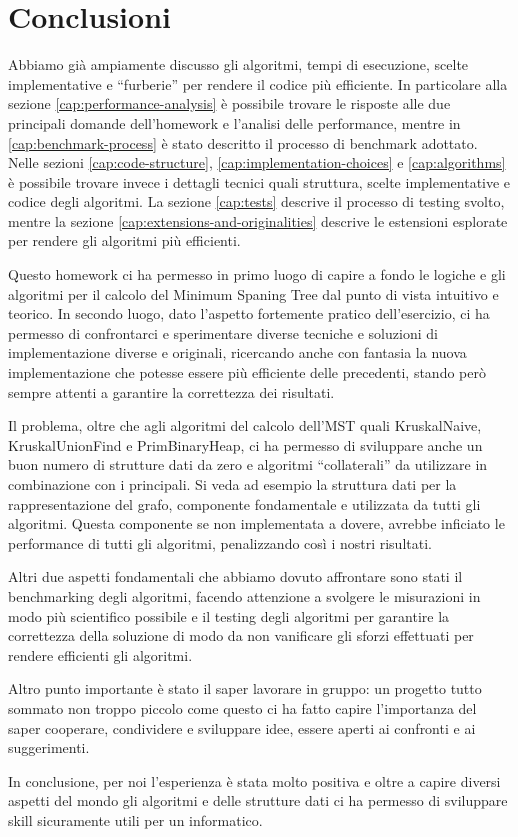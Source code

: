 \section{Conclusioni}
\label{cap:conclusions}

Abbiamo già ampiamente discusso gli algoritmi, tempi di esecuzione, scelte implementative e ``furberie'' per rendere il codice più
efficiente. In particolare alla sezione \ref{cap:performance-analysis} è possibile trovare le risposte alle due principali domande
dell'homework e l'analisi delle performance, mentre in \ref{cap:benchmark-process} è stato descritto il processo di benchmark adottato. 
Nelle sezioni \ref{cap:code-structure}, \ref{cap:implementation-choices} e \ref{cap:algorithms} è possibile trovare invece
i dettagli tecnici quali struttura, scelte implementative e codice degli algoritmi. La sezione \ref{cap:tests} descrive il processo
di testing svolto, mentre la sezione \ref{cap:extensions-and-originalities} descrive le estensioni esplorate per rendere gli 
algoritmi più efficienti.

Questo homework ci ha permesso in primo luogo di capire a fondo le logiche e gli algoritmi per il calcolo del Minimum Spaning Tree dal
punto di vista intuitivo e teorico. In secondo luogo, dato l'aspetto fortemente pratico dell'esercizio, ci ha permesso di confrontarci
e sperimentare diverse tecniche e soluzioni di implementazione diverse e originali, ricercando anche con fantasia la nuova 
implementazione che potesse essere più efficiente delle precedenti, stando però sempre attenti a garantire la correttezza dei risultati.

Il problema, oltre che agli algoritmi del calcolo dell'MST quali KruskalNaive, KruskalUnionFind e PrimBinaryHeap, ci ha permesso di 
sviluppare anche un buon numero di strutture dati da zero e algoritmi ``collaterali'' da utilizzare in combinazione con i principali.
Si veda ad esempio la struttura dati per la rappresentazione del grafo, componente fondamentale e utilizzata da tutti gli algoritmi. 
Questa componente se non implementata a dovere, avrebbe inficiato le performance di tutti gli algoritmi, penalizzando così i nostri
risultati.

Altri due aspetti fondamentali che abbiamo dovuto affrontare sono stati il benchmarking degli algoritmi, facendo attenzione a svolgere
le misurazioni in modo più scientifico possibile e il testing degli algoritmi per garantire la correttezza della soluzione di modo da
non vanificare gli sforzi effettuati per rendere efficienti gli algoritmi.

Altro punto importante è stato il saper lavorare in gruppo: un progetto tutto sommato non troppo piccolo come questo ci ha
fatto capire l'importanza del saper cooperare, condividere e sviluppare idee, essere aperti ai confronti e ai suggerimenti.

\vspace{1em}
In conclusione, per noi l'esperienza è stata molto positiva e oltre a capire diversi aspetti del mondo gli algoritmi e delle strutture
dati ci ha permesso di sviluppare skill sicuramente utili per un informatico.